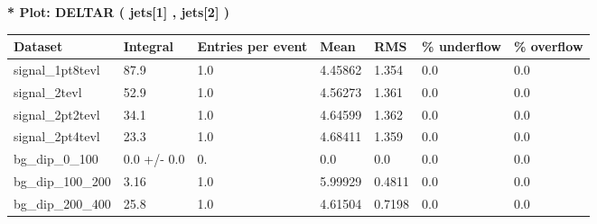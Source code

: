 \documentclass[a4paper, 10pt]{article}
\begin{document}
\textbf{* Plot: DELTAR ( jets[1] , jets[2] ) }\\
   \begin{table}[H]
  \begin{center}
    \begin{tabular}{|m{23.0mm}|m{23.0mm}|m{18.0mm}|m{19.0mm}|m{19.0mm}|m{19.0mm}|m{19.0mm}|}
      \hline
      {\cellcolor{yellow}         Dataset}& {\cellcolor{yellow}         Integral}& {\cellcolor{yellow}         Entries per event}& {\cellcolor{yellow}         Mean}& {\cellcolor{yellow}         RMS}& {\cellcolor{yellow}         \% underflow}& {\cellcolor{yellow}         \% overflow}\\
      \hline
      {\cellcolor{white}         signal\_1pt8tevl}& {\cellcolor{white}         87.9}& {\cellcolor{white}         1.0}& {\cellcolor{white}         4.45862}& {\cellcolor{white}         1.354}& {\cellcolor{green}         0.0}& {\cellcolor{green}         0.0}\\
      \hline
      {\cellcolor{white}         signal\_2tevl}& {\cellcolor{white}         52.9}& {\cellcolor{white}         1.0}& {\cellcolor{white}         4.56273}& {\cellcolor{white}         1.361}& {\cellcolor{green}         0.0}& {\cellcolor{green}         0.0}\\
      \hline
      {\cellcolor{white}         signal\_2pt2tevl}& {\cellcolor{white}         34.1}& {\cellcolor{white}         1.0}& {\cellcolor{white}         4.64599}& {\cellcolor{white}         1.362}& {\cellcolor{green}         0.0}& {\cellcolor{green}         0.0}\\
      \hline
      {\cellcolor{white}         signal\_2pt4tevl}& {\cellcolor{white}         23.3}& {\cellcolor{white}         1.0}& {\cellcolor{white}         4.68411}& {\cellcolor{white}         1.359}& {\cellcolor{green}         0.0}& {\cellcolor{green}         0.0}\\
      \hline
      {\cellcolor{white}         bg\_dip\_0\_100}& {\cellcolor{white}         0.0 +/\-- 0.0}& {\cellcolor{white}         0.}& {\cellcolor{white}         0.0}& {\cellcolor{white}         0.0}& {\cellcolor{green}         0.0}& {\cellcolor{green}         0.0}\\
      \hline
      {\cellcolor{white}         bg\_dip\_100\_200}& {\cellcolor{white}         3.16}& {\cellcolor{white}         1.0}& {\cellcolor{white}         5.99929}& {\cellcolor{white}         0.4811}& {\cellcolor{green}         0.0}& {\cellcolor{green}         0.0}\\
      \hline
      {\cellcolor{white}         bg\_dip\_200\_400}& {\cellcolor{white}         25.8}& {\cellcolor{white}         1.0}& {\cellcolor{white}         4.61504}& {\cellcolor{white}         0.7198}& {\cellcolor{green}         0.0}& {\cellcolor{green}         0.0}\\

\end{tabular}
\end{center}
\end{table}
\end{document}
